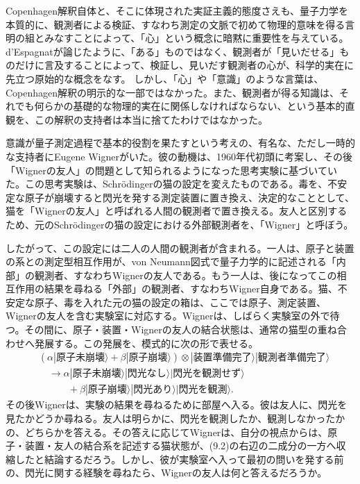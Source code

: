 Copenhagen解釈自体と、そこに体現された実証主義的態度さえも、量子力学を本質的に、観測者による検証、すなわち測定の文脈で初めて物理的意味を得る言明の組とみなすことによって、「心」という概念に暗黙に重要性を与えている。d'Espagnat\cite{ref497}が論じたように、「ある」ものではなく、観測者が「見いだせる」ものだけに言及することによって、検証し、見いだす観測者の心が、科学的実在に先立つ原始的な概念をなす。
\hypertarget{srcpage:364}{}\label{srcpage:364}
しかし、「心」や「意識」のような言葉は、Copenhagen解釈の明示的な一部ではなかった。また、観測者が得る知識は、それでも何らかの基礎的な物理的実在に関係しなければならない、という基本的直観を、この解釈の支持者は本当に捨てたわけではなかった。

意識が量子測定過程で基本的役割を果たすという考えの、有名な、ただし一時的な支持者にEugene Wignerがいた。彼の動機は、1960年代初頭に考案し、その後「Wignerの友人」の問題として知られるようになった思考実験\cite{ref498}に基づいていた。この思考実験は、Schrödingerの猫の設定を変えたものである。毒を、不安定な原子が崩壊すると閃光を発する測定装置に置き換え、決定的なこととして、猫を「Wignerの友人」と呼ばれる人間の観測者で置き換える。友人と区別するため、元のSchrödingerの猫の設定における外部観測者を、「Wigner」と呼ぼう。

したがって、この設定には二人の人間の観測者が含まれる。一人は、原子と装置の系との測定型相互作用が、von Neumann図式で量子力学的に記述される「内部」の観測者、すなわちWignerの友人である。もう一人は、後になってこの相互作用の結果を尋ねる「外部」の観測者、すなわちWigner自身である。猫、不安定な原子、毒を入れた元の猫の設定の箱は、ここでは原子、測定装置、Wignerの友人を含む実験室に対応する。Wignerは、しばらく実験室の外で待つ。その間に、原子・装置・Wignerの友人の結合状態は、通常の猫型の重ね合わせへ発展する。この発展を、模式的に次の形で表せる。
\begin{equation}
\begin{aligned}
&(\alpha|\text{原子未崩壊}\rangle+\beta|\text{原子崩壊}\rangle)
\otimes|\text{装置準備完了}\rangle|\text{観測者準備完了}\rangle\\
&\quad\longrightarrow\alpha|\text{原子未崩壊}\rangle|\text{閃光なし}\rangle|\text{閃光を観測せず}\rangle\\
&\qquad\quad+\beta|\text{原子崩壊}\rangle|\text{閃光あり}\rangle|\text{閃光を観測}\rangle .
\end{aligned}\tag{9.2}
\end{equation}
その後Wignerは、実験の結果を尋ねるために部屋へ入る。彼は友人に、閃光を見たかどうか尋ねる。友人は明らかに、閃光を観測したか、観測しなかったかの、どちらかを答える。その答えに応じてWignerは、自分の視点からは、原子・装置・友人の結合系を記述する猫状態が、(9.2)の右辺の二成分の一方へ収縮したと結論するだろう。しかし、彼が実験室へ入って最初の問いを発する前の、閃光に関する経験を尋ねたら、Wignerの友人は何と答えるだろうか。

